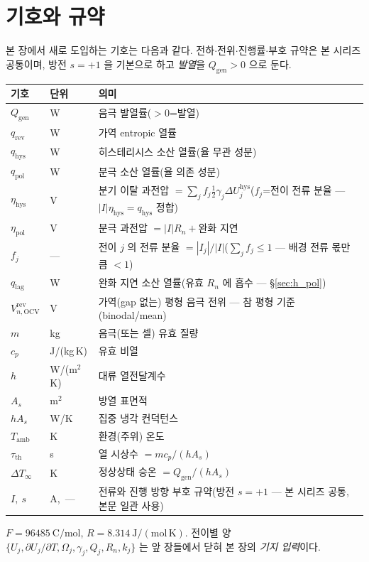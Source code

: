 \documentclass[11pt,a4paper]{article}
\newcommand{\OCV}{\mathrm{OCV}}
\newcommand{\hys}{\mathrm{hys}}
\newcommand{\pol}{\mathrm{pol}}
\newcommand{\rev}{\mathrm{rev}}
\newcommand{\gen}{\mathrm{gen}}
\newcommand{\amb}{\mathrm{amb}}
\newcommand{\Th}{\mathrm{th}}
\newcommand{\lag}{\mathrm{lag}}
\begin{document}
\section{기호와 규약}\label{sec:h_notation}
본 장에서 새로 도입하는 기호는 다음과 같다. 전하$\cdot$전위$\cdot$진행률$\cdot$부호 규약은 본 시리즈 공통이며,
방전 $s=+1$ 을 기본으로 하고 \emph{발열}을 $Q_\gen>0$ 으로 둔다.
\begin{longtable}{p{} p{} >{\raggedright\arraybackslash}p{}}
\toprule 기호 & 단위 & 의미 \\ \midrule \endhead
$Q_\gen$ & W & 음극 발열률($>0$=발열) \\
$q_\rev$ & W & 가역 entropic 열률 \\
$q_\hys$ & W & 히스테리시스 소산 열률(율 무관 성분) \\
$q_\pol$ & W & 분극 소산 열률(율 의존 성분) \\
$\eta_\hys$ & V & 분기 이탈 과전압 $=\sum_jf_j\tfrac12\gamma_j\Delta U_j^\hys$($f_j$=전이 전류 분율 — $|I|\eta_\hys=q_\hys$ 정합) \\
$\eta_\pol$ & V & 분극 과전압 $=|I|R_n+$완화 지연 \\
$f_j$ & --- & 전이 $j$ 의 전류 분율 $=|I_j|/|I|$($\sum_jf_j\le1$ — 배경 전류 몫만큼 $<1$) \\
$q_\lag$ & W & 완화 지연 소산 열률(유효 $R_n$ 에 흡수 — \S\ref{sec:h_pol}) \\
$V_{n,\OCV}^\rev$ & V & 가역(gap 없는) 평형 음극 전위 — 참 평형 기준(binodal/mean) \\
$m$ & kg & 음극(또는 셀) 유효 질량 \\
$c_p$ & J/(kg\,K) & 유효 비열 \\
$h$ & W/(m$^2$K) & 대류 열전달계수 \\
$A_s$ & m$^2$ & 방열 표면적 \\
$hA_s$ & W/K & 집중 냉각 컨덕턴스 \\
$T_\amb$ & K & 환경(주위) 온도 \\
$\tau_\Th$ & s & 열 시상수 $=mc_p/(hA_s)$ \\
$\Delta T_\infty$ & K & 정상상태 승온 $=Q_\gen/(hA_s)$ \\
$I,\ s$ & A,\ --- & 전류와 진행 방향 부호 규약(방전 $s=+1$ — 본 시리즈 공통, 본문 일관 사용) \\
\bottomrule
\end{longtable}
$F=96485\ \mathrm{C/mol}$, $R=8.314\ \mathrm{J/(mol\,K)}$. 전이별 양 $\{U_j,\partial U_j/\partial T,\Omega_j,
\gamma_j,Q_j,R_n,k_j\}$ 는 앞 장들에서 닫혀 본 장의 \emph{기지 입력}이다.
\end{document}
